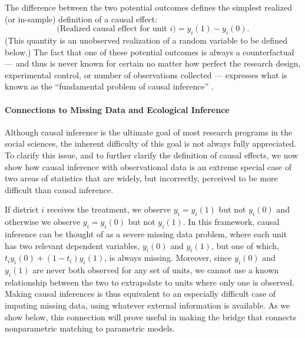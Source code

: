 \documentclass[11pt,titlepage]{article}
\begin{document}
The difference between the two potential outcomes defines the simplest
realized (or in-sample) definition of a causal effect:
\begin{equation}
  \label{rce}
  \text{(Realized causal effect for unit $i$)} = y_i(1) - y_i(0).
\end{equation}
(This quantity is an unobserved realization of a random variable to be
defined below.)  The fact that one of these potential outcomes is
always a counterfactual --- and thus is never known for certain no
matter how perfect the research design, experimental control, or
number of observations collected --- expresses what is known as the
``fundamental problem of causal inference'' \citep{Holland86}.

\paragraph{Connections to Missing Data and Ecological Inference}
Although causal inference is the ultimate goal of most research
programs in the social sciences, the inherent difficulty of this goal
is not always fully appreciated.  To clarify this issue, and to
further clarify the definition of causal effects, we now show how
causal inference with observational data is an extreme special case of
two areas of statistics that are widely, but incorrectly, perceived to
be more difficult than causal inference.

If district $i$ receives the treatment, we observe $y_i=y_i(1)$ but
not $y_i(0)$ and otherwise we observe $y_i=y_i(0)$ but not $y_i(1)$.
In this framework, causal inference can be thought of as a severe
missing data problem, where each unit has two relevant dependent
variables, $y_i(0)$ and $y_i(1)$, but one of which, $t_iy_i(0) +
(1-t_i)y_i(1)$, is always missing.  Moreover, since $y_i(0)$ and
$y_i(1)$ are never both observed for any set of units, we cannot use a
known relationship between the two to extrapolate to units where only
one is observed.  Making causal inferences is thus equivalent to an
especially difficult case of imputing missing data, using whatever
external information is available.  As we show below, this connection
will prove useful in making the bridge that connects nonparametric
matching to parametric models.
\end{document}
